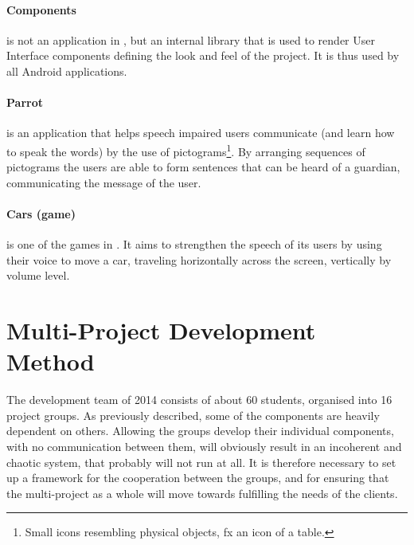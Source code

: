 \paragraph{\giraf Components}
is not an application in \giraf, but an internal library that is used to render User Interface components defining the look and feel of the project.
It is thus used by all Android applications.

\paragraph{Parrot}
is an application that helps speech impaired users communicate (and learn how to speak the words) by the use of pictograms\footnote{Small icons resembling physical objects, fx an icon of a table.}.
By arranging sequences of pictograms the users are able to form sentences that can be heard of a guardian, communicating the message of the user.

\paragraph{Cars (game)}
is one of the games in \giraf.
It aims to strengthen the speech of its users by using their voice to move a car, traveling horizontally across the screen, vertically by volume level.



\section{Multi-Project Development Method}\label{sec:giraf:development}
The \giraf development team of 2014 consists of about 60 students, organised into 16 project groups. 
As previously described, some of the \giraf components are heavily dependent on others. 
Allowing the groups develop their individual components, with no communication between them, will obviously result in an incoherent and chaotic system, that probably will not run at all. 
It is therefore necessary to set up a framework for the cooperation between the groups, and for ensuring that the multi-project as a whole will move towards fulfilling the needs of the clients.

